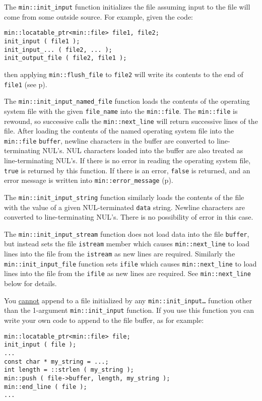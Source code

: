 \documentclass[12pt]{article}
\newcommand{\pagref}[1]{p\pageref{#1}}
\newcommand{\EOL}{\penalty \exhyphenpenalty}
\newenvironment{indpar}[1][0.3in]%
	{\begin{list}{}%
		     {\setlength{\itemsep}{0in}%
		      \setlength{\topsep}{0in}%
		      \setlength{\parsep}{1ex}%
		      \setlength{\labelwidth}{#1}%
		      \setlength{\leftmargin}{#1}%
		      \addtolength{\leftmargin}{\labelsep}}%
	 \item}%
	{\end{list}}
\begin{document}
The {\tt min::init\_input} function initializes the file assuming
input to the file will come from some outside source.  For example,
given the code:
\begin{indpar}\begin{verbatim}
min::locatable_ptr<min::file> file1, file2;
init_input ( file1 );
init_input_... ( file2, ... );
init_output_file ( file2, file1 );
\end{verbatim}\end{indpar}
then applying {\tt min::\EOL flush\_\EOL file} to {\tt file2} will write
its contents to the end of {\tt file1}
(see \pagref{MIN::FLUSH_FILE}).

The {\tt min::init\_input\_named\_file} function loads the contents
of the operating system
file with the given {\tt file\_\EOL name} into the {\tt min::file}.  The
{\tt min::file}
is rewound, so successive calls the {\tt min::\EOL next\_\EOL line}
will return successive lines of the file.  After loading the contents
of the named operating system file
into the {\tt min::file} {\tt buffer}, newline characters in the buffer
are converted to line-terminating NUL's.  NUL characters loaded into the
buffer are also treated as line-terminating NUL's.  If there is no error in
reading the operating system file, {\tt true} is returned by this function.  If
there is an error, {\tt false} is returned, and an error message
is written into {\tt min::\EOL error\_\EOL message}
(\pagref{ERROR_MESSAGE}).

The {\tt min::init\_input\_string} function similarly loads the contents
of the file with the value of a given NUL-terminated {\tt data} string.
Newline characters are converted to line-terminating NUL's.
There is no possibility of error in this case.

The {\tt min::init\_input\_stream} function does not load data into
the file {\tt buffer}, but instead sets the file {\tt istream} member
which causes {\tt min::\EOL next\_\EOL line} to load lines into the
file from the {\tt istream} as new lines are required.  Similarly
the {\tt min::\EOL init\_\EOL input\_\EOL file} function sets
{\tt ifile} which causes {\tt min::\EOL next\_\EOL line} to load lines
into the file from the {\tt ifile} as new lines are required.
See {\tt min::\EOL next\_\EOL line} below for details.

You \underline{cannot} append to a file initialized by any
{\tt min::\EOL init\_\EOL input\ldots} function other than
the 1-argument {\tt min::\EOL init\_\EOL input} function.
If you use this function you can write your own code to append
to the file buffer, as for example:
\begin{indpar}\begin{verbatim}
min::locatable_ptr<min::file> file;
init_input ( file );
...
const char * my_string = ...;
int length = ::strlen ( my_string );
min::push ( file->buffer, length, my_string );
min::end_line ( file );
...
\end{verbatim}\end{indpar}
\end{document}
